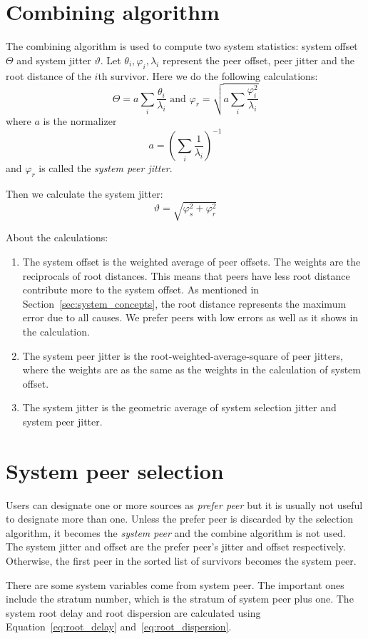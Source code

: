 \section{Combining algorithm}%
\label{sec:combine_algorithm}
The combining algorithm is used to compute two system statistics: system offset 
$\Theta$ and system jitter $\vartheta$. Let $\theta_i, \varphi_i, \lambda_i$
represent the peer offset, peer jitter and the root distance of the $i$th
survivor. Here we do the following calculations:~\cite{redbook}
\begin{equation}
    \Theta = a \sum^{}_{i} \frac{\theta_i}{\lambda_i} \text{ and } 
    \varphi_r = \sqrt{a \sum^{}_{i} \frac{\varphi_i ^ 2}{\lambda_i}}
    \label{eq:system_offset_selection_jitter}
\end{equation}
where $a$ is the normalizer
\begin{equation}
    a = \left( \sum^{}_{i} \frac{1}{\lambda_i} \right) ^ {-1}
    \label{eq:normalizer}
\end{equation}
and $\varphi_r$ is called the \emph{system peer jitter}.~\cite{rfc5905}

Then we calculate the system jitter:~\cite{redbook}
\begin{equation}
    \vartheta = \sqrt{\varphi_s^2 + \varphi_r^2}
    \label{eq:system_jitter}
\end{equation}

About the calculations:
\begin{enumerate}
    \item The system offset is the weighted average of peer offsets. The
        weights are the reciprocals of root distances. This means that peers
        have less root distance contribute more to the system offset. As
        mentioned in Section~\ref{sec:system_concepts}, the root distance
        represents the maximum error due to all causes. We prefer peers with
        low errors as well as it shows in the calculation.
    \item The system peer jitter is the root-weighted-average-square of peer
        jitters, where the weights are as the same as the weights in the
        calculation of system offset.
    \item The system jitter is the geometric average of system selection jitter
        and system peer jitter.
\end{enumerate}

\section{System peer selection}%
\label{sec:system_peer_selection}
Users can designate one or more sources as \emph{prefer peer} but it is
usually not useful to designate more than one. Unless the prefer peer is
discarded by the selection algorithm, it becomes the \emph{system peer} and
the combine algorithm is not used. The system jitter and offset are the
prefer peer's jitter and offset respectively. Otherwise, the first peer in
the sorted list of survivors becomes the system peer. 

There are some system variables come from system peer. The important ones
include the stratum number, which is the stratum of system peer plus one.
The system root delay and root dispersion are calculated using
Equation~\ref{eq:root_delay} and~\ref{eq:root_dispersion}.

